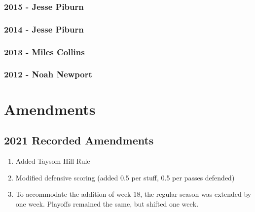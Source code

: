 \documentclass[
]{book}
\providecommand{\tightlist}{%
  \setlength{\itemsep}{0pt}\setlength{\parskip}{0pt}}
\begin{document}
\hypertarget{jesse-piburn-1}{%
\subsection*{\texorpdfstring{\textbf{2015} - Jesse Piburn}{2015 - Jesse Piburn}}\label{jesse-piburn-1}}

\hypertarget{jesse-piburn-2}{%
\subsection*{\texorpdfstring{\textbf{2014} - Jesse Piburn}{2014 - Jesse Piburn}}\label{jesse-piburn-2}}

\hypertarget{miles-collins-2}{%
\subsection*{\texorpdfstring{\textbf{2013} - Miles Collins}{2013 - Miles Collins}}\label{miles-collins-2}}

\hypertarget{noah-newport-1}{%
\subsection*{\texorpdfstring{\textbf{2012} - Noah Newport}{2012 - Noah Newport}}\label{noah-newport-1}}

\hypertarget{amendments}{%
\chapter{Amendments}\label{amendments}}

\hypertarget{recorded-amendments}{%
\section{2021 Recorded Amendments}\label{recorded-amendments}}

\begin{enumerate}
\def\labelenumi{\arabic{enumi}.}
\tightlist
\item
  Added Taysom Hill Rule
\item
  Modified defensive scoring (added 0.5 per stuff, 0.5 per passes defended)
\item
  To accommodate the addition of week 18, the regular season was extended by one week. Playoffs remained the same, but shifted one week.
\end{enumerate}
\end{document}
